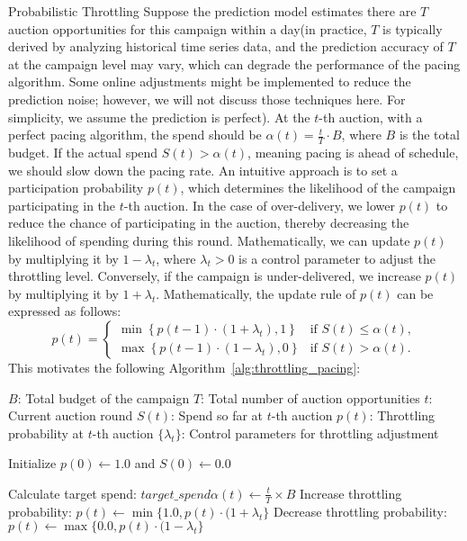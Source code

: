 \documentclass[../main.tex]{subfiles}
\begin{document}
\begin{section}{Probabilistic Throttling}
	Suppose the prediction model estimates there are \(T\) auction opportunities for this campaign within a day(in practice, \(T\) is typically derived by analyzing historical time series data, and the prediction accuracy of \(T\) at the campaign level may vary, which can degrade the performance of the pacing algorithm. Some online adjustments might be implemented to reduce the prediction noise; however, we will not discuss those techniques here. For simplicity, we assume the prediction is perfect). At the \(t\)-th auction, with a perfect pacing algorithm, the spend should be \(\alpha(t) = \frac{t}{T} \cdot B\), where \(B\) is the total budget. If the actual spend \(S(t) > \alpha(t)\), meaning pacing is ahead of schedule, we should slow down the pacing rate. An intuitive approach is to set a participation probability \(p(t)\), which determines the likelihood of the campaign participating in the \(t\)-th auction. In the case of over-delivery, we lower \(p(t)\) to reduce the chance of participating in the auction, thereby decreasing the likelihood of spending during this round. Mathematically, we can update \(p(t)\) by multiplying it by \(1 - \lambda_t\), where \(\lambda_t >0 \) is a control parameter to adjust the throttling level. Conversely, if the campaign is under-delivered, we increase \(p(t)\) by multiplying it by \(1 + \lambda_t \). Mathematically, the update rule of $p(t)$ can be expressed as follows: 
	\[
	p(t) =
	\begin{cases} 
		\min \left\{ p(t-1)\cdot (1 + \lambda_t), 1 \right\}& \text{if } S(t) \leq \alpha(t), \\
		\max \left\{   p(t-1)\cdot (1 - \lambda_t), 0 \right\} & \text{if } S(t) > \alpha(t).
	\end{cases}
	\]
	This motivates the following Algorithm~\ref{alg:throttling_pacing}:
	
		\begin{algorithm} 
			\caption{Throttling-based Budget Pacing Algorithm}
			\label{alg:throttling_pacing}
			\begin{algorithmic}[1]
				\Require $B$: Total budget of the campaign
				\Require $T$: Total number of auction opportunities
				\Require $t$: Current auction round
				\Require $S(t)$: Spend so far at  $t$-th auction
				\Require $p(t)$: Throttling probability at $t$-th auction
				\Require $\{\lambda_t\}$: Control parameters for throttling adjustment
				
				\State Initialize $p(0) \gets 1.0$ and $S(0) \gets 0.0$
				
				\State Calculate target spend: $target\_spend \alpha(t) \gets \frac{t}{T} \times B$
				\State Increase throttling probability: $p(t) \gets \min \{ 1.0, p(t) \cdot (1 + \lambda_t \}$
				\Else
				\State Decrease throttling probability:  $p(t) \gets \max \{ 0.0 , p(t) \cdot (1 - \lambda_t \}$
				\EndIf
				

\end{algorithmic}
\end{algorithm}
\end{section}
\end{document}
